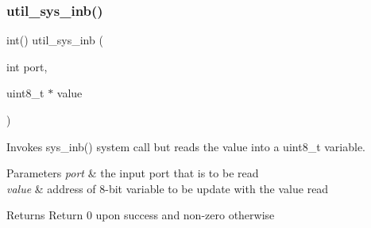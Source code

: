 \subsubsection{\texorpdfstring{util\+\_\+sys\+\_\+inb()}{util\_sys\_inb()}}
{\footnotesize\ttfamily int() util\+\_\+sys\+\_\+inb (\begin{DoxyParamCaption}\item[{int}]{port,  }\item[{uint8\+\_\+t $\ast$}]{value }\end{DoxyParamCaption})}



Invokes sys\+\_\+inb() system call but reads the value into a uint8\+\_\+t variable. 


\begin{DoxyParams}{Parameters}
{\em port} & the input port that is to be read \\
\hline
{\em value} & address of 8-\/bit variable to be update with the value read \\
\hline
\end{DoxyParams}
\begin{DoxyReturn}{Returns}
Return 0 upon success and non-\/zero otherwise 
\end{DoxyReturn}
